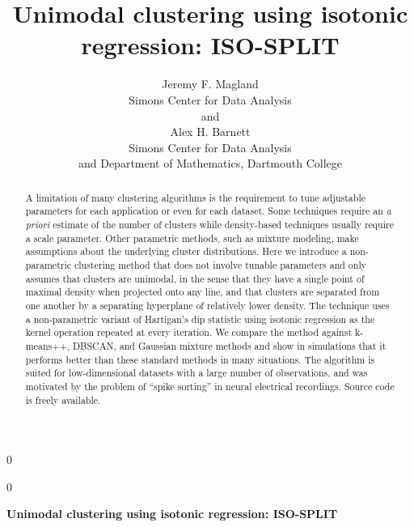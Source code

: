 \documentclass[10pt]{article}
\newcommand{\blind}{0}
\begin{document}


\def\spacingset#1{\renewcommand{\baselinestretch}%
{#1}\small\normalsize} \spacingset{1}


\blind
{
  \title{\bf Unimodal clustering using isotonic regression: ISO-SPLIT}
  \author{Jeremy F. Magland\hspace{.2cm}\\
    Simons Center for Data Analysis\\
    and \\
    Alex H. Barnett \\
    Simons Center for Data Analysis \\ and Department of Mathematics, Dartmouth College}
  \maketitle
} \fi

\blind
{
  \bigskip
  \bigskip
  \bigskip
  \begin{center}
    {\LARGE\bf Unimodal clustering using isotonic regression: ISO-SPLIT}
  \end{center}
  \medskip
} \fi

\bigskip
\begin{abstract}
A limitation of many clustering algorithms is the requirement to tune adjustable parameters for each application or even for each dataset. Some techniques require an \emph{a priori} estimate of the number of clusters while density-based techniques usually require a scale parameter. Other parametric methods, such as mixture modeling, make assumptions about the underlying cluster distributions. Here we introduce a non-parametric clustering method that does not involve tunable parameters and only assumes that clusters are unimodal, in the sense that they have a single point of maximal density when projected onto any line, and that clusters are separated from one another by a separating hyperplane of relatively lower density. The technique uses a non-parametric variant of Hartigan's dip statistic using isotonic regression as the kernel operation repeated at every iteration. We compare the method against k-means++, DBSCAN, and Gaussian mixture methods and show in simulations that it performs better than these standard methods in many situations. The algorithm is suited for low-dimensional datasets with a large number of observations, and was motivated by the problem of ``spike sorting'' in neural electrical recordings. Source code is freely available.
\end{abstract}
\end{document}
